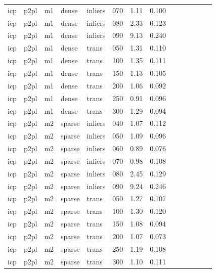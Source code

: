 \begin{table}[htbp]
\begin{tabular}{llllllrrrrrrrr}
  icp & p2pl & m1 & dense & inliers & 070 & 1.11 & 0.100 \\
  icp & p2pl & m1 & dense & inliers & 080 & 2.33 & 0.123 \\
  icp & p2pl & m1 & dense & inliers & 090 & 9.13 & 0.240 \\
  icp & p2pl & m1 & dense & trans & 050 & 1.31 & 0.110 \\
  icp & p2pl & m1 & dense & trans & 100 & 1.35 & 0.111 \\
  icp & p2pl & m1 & dense & trans & 150 & 1.13 & 0.105 \\
  icp & p2pl & m1 & dense & trans & 200 & 1.06 & 0.092 \\
  icp & p2pl & m1 & dense & trans & 250 & 0.91 & 0.096 \\
  icp & p2pl & m1 & dense & trans & 300 & 1.29 & 0.094 \\
  icp & p2pl & m2 & sparse & inliers & 040 & 1.07 & 0.112 \\
  icp & p2pl & m2 & sparse & inliers & 050 & 1.09 & 0.096 \\
  icp & p2pl & m2 & sparse & inliers & 060 & 0.89 & 0.076 \\
  icp & p2pl & m2 & sparse & inliers & 070 & 0.98 & 0.108 \\
  icp & p2pl & m2 & sparse & inliers & 080 & 2.45 & 0.129 \\
  icp & p2pl & m2 & sparse & inliers & 090 & 9.24 & 0.246 \\
  icp & p2pl & m2 & sparse & trans & 050 & 1.27 & 0.107 \\
  icp & p2pl & m2 & sparse & trans & 100 & 1.30 & 0.120 \\
  icp & p2pl & m2 & sparse & trans & 150 & 1.08 & 0.094 \\
  icp & p2pl & m2 & sparse & trans & 200 & 1.07 & 0.073 \\
  icp & p2pl & m2 & sparse & trans & 250 & 1.19 & 0.108 \\
  icp & p2pl & m2 & sparse & trans & 300 & 1.10 & 0.111 \\
\bottomrule
\end{tabular}
\end{table}
